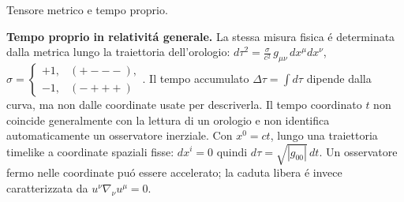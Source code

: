 \begin{frame}[t]{Tensore metrico e tempo proprio.}
\begin{itemize}
    \textbf{Tempo proprio in relativit\'a generale.} La stessa misura fisica \'e determinata dalla metrica lungo
    la traiettoria dell'orologio: $d\tau^2=\frac{\sigma}{c^2}\,g_{\mu\nu}\,dx^\mu dx^\nu$, $\sigma=\begin{cases}+1,&(+---),\\-1,&(-+++)\end{cases}$. Il tempo accumulato $\Delta\tau=\int d\tau$ dipende dalla curva, ma non dalle coordinate usate per descriverla. Il tempo coordinato $t$ non coincide generalmente con la lettura di un orologio e non identifica automaticamente un osservatore inerziale. Con $x^0=ct$, lungo una traiettoria timelike a coordinate spaziali fisse: $dx^i=0$ quindi $d\tau=\sqrt{|g_{00}|}\,dt$.
Un osservatore fermo nelle coordinate pu\'o essere accelerato; la caduta libera \'e invece caratterizzata da $u^\nu\nabla_\nu u^\mu=0$.
\end{itemize}
\end{frame}

